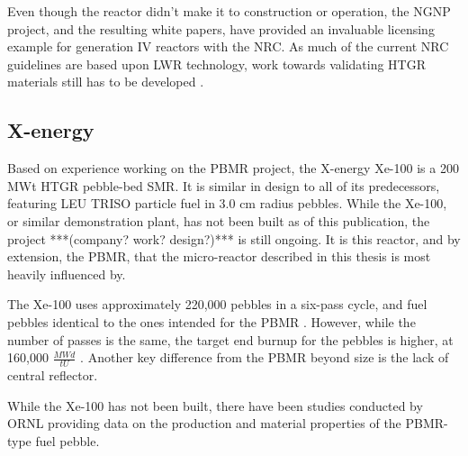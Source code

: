 Even though the reactor didn't make it to construction or operation, the NGNP project, and the resulting white papers, have provided an invaluable licensing example for generation IV reactors with the NRC.  As much of the current NRC guidelines are based upon LWR technology, work towards validating HTGR materials still has to be developed \cite{lommers_ngnp_2012}.

\subsection{X-energy}

Based on experience working on the PBMR project, the X-energy Xe-100 is a 200 MWt HTGR pebble-bed SMR.  It is similar in design to all of its predecessors, featuring LEU TRISO particle fuel in 3.0 cm radius pebbles.  While the Xe-100, or similar demonstration plant, has not been built as of this publication, the project ***(company?  work?  design?)*** is still ongoing.  It is this reactor, and by extension, the PBMR, that the micro-reactor described in this thesis is most heavily influenced by.

The Xe-100 uses approximately 220,000 pebbles in a six-pass cycle, and fuel pebbles identical to the ones intended for the PBMR \cite{harlan_x-energy_2018}.  However, while the number of passes is the same, the target end burnup for the pebbles is higher, at 160,000 $\frac{MWd}{tU}$ \cite{agnihotri_intrinsically_2017}.  Another key difference from the PBMR beyond size is the lack of central reflector.

While the Xe-100 has not been built, there have been studies conducted by ORNL providing data on the production and material properties of the PBMR-type fuel pebble.
